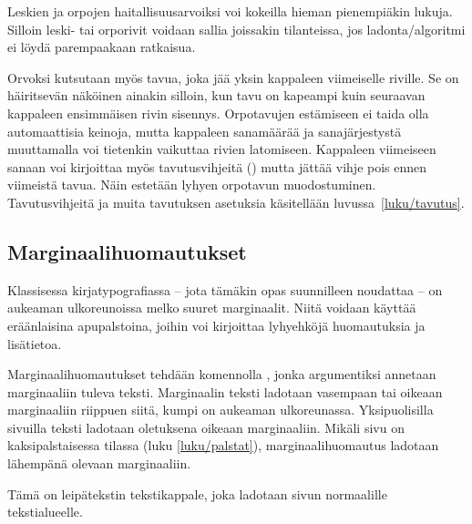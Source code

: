 \begin{koodilohkosis}
\end{koodilohkosis}

Leskien ja orpojen haitallisuusarvoiksi voi kokeilla hieman pienempiäkin
lukuja. Silloin leski- tai orporivit voidaan sallia joissakin
tilanteissa, jos ladonta\-/algoritmi ei löydä parempaakaan ratkaisua.

Orvoksi kutsutaan myös tavua, joka jää yksin kappaleen viimeiselle
riville. Se on häiritsevän näköinen ainakin silloin, kun tavu on
kapeampi kuin seuraavan kappaleen ensimmäisen rivin sisennys.
Orpotavujen estämiseen ei taida olla automaattisia keinoja, mutta
kappaleen sanamäärää ja sanajärjestystä muuttamalla voi tietenkin
vaikuttaa rivien latomiseen. Kappaleen viimeiseen sanaan voi kirjoittaa
myös tavutusvihjeitä (\komento{-}) mutta jättää vihje pois ennen
viimeistä tavua. Näin estetään lyhyen orpotavun muodostuminen.
Tavutusvihjeitä ja muita tavutuksen asetuksia käsitellään
luvussa~\ref{luku/tavutus}.

\subsection{Marginaalihuomautukset}
\label{luku/marginaalihuomautukset}

Klassisessa kirjatypografiassa -- jota tämäkin opas suunnilleen
noudattaa -- on aukeaman ulkoreunoissa melko suuret marginaalit. Niitä
voidaan käyttää eräänlaisina apupalstoina, joihin voi kirjoittaa
lyhyehköjä huomautuksia ja lisätietoa.

Marginaalihuomautukset tehdään komennolla , jonka
argumentiksi annetaan marginaaliin tuleva teksti. Marginaalin teksti
ladotaan vasempaan tai oikeaan marginaaliin riippuen siitä, kumpi on
aukeaman ulkoreunassa. Yksipuolisilla sivuilla teksti ladotaan
oletuksena oikeaan marginaaliin. Mikäli sivu on kaksipalstaisessa
tilassa (luku \ref{luku/palstat}), marginaalihuomautus ladotaan
lähempänä olevaan marginaaliin.

\begin{koodilohkosis}
Tämä on leipätekstin tekstikappale,
joka ladotaan sivun normaalille tekstialueelle.
\end{koodilohkosis}


